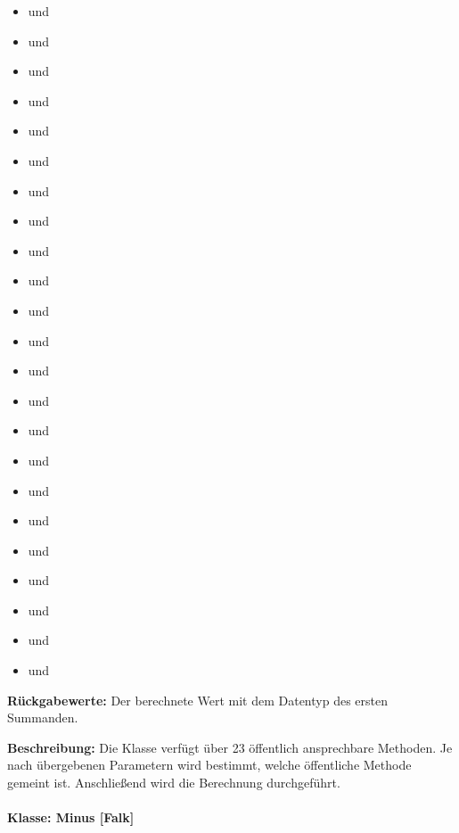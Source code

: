 \begin{itemize}
	\item {} und 
	\item {} und 
	\item {} und 
	\item {} und 
	\item {} und 
	\item {} und 
	\item {} und 
	\item {} und 
	\item {} und 
	\item {} und 
	\item {} und 
	\item {} und 
	\item {} und 
	\item {} und 
	\item {} und 
	\item {} und 
	\item {} und 
	\item {} und 
	\item {} und 
	\item {} und 
	\item {} und 
	\item {} und 
	\item {} und 
\end{itemize}

\textbf{Rückgabewerte: }Der berechnete Wert mit dem Datentyp des ersten Summanden. 

\textbf{Beschreibung: }Die Klasse verfügt über 23 öffentlich ansprechbare Methoden. Je nach übergebenen Parametern wird bestimmt, welche öffentliche Methode gemeint ist. Anschließend wird die Berechnung durchgeführt. 

\paragraph{Klasse: Minus [Falk]}

